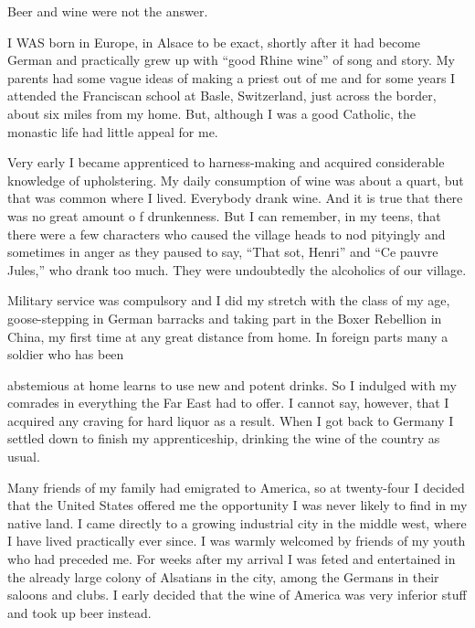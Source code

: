 

\bbChapterPreamble




\begin{biblechapter}
Beer and wine were not the answer.
\end{biblechapter}


\begin{biblechapter}
    I WAS born in Europe, in Alsace to be exact, 
    shortly after it had become German 
    and practically grew up with “good Rhine wine” of song and story.
\verse My parents had some vague ideas of making a priest out of me 
    and for some years I attended the Franciscan school 
    at Basle, Switzerland, 
    just across the border, 
    about six miles from my home.
\verse But, although I was a good Catholic, 
    the monastic life had little appeal for me.

\verse Very early I became apprenticed to harness-making and acquired considerable knowledge of upholstering. My daily consumption of wine was about a quart, but that was common where I lived. Everybody drank wine. And it is true that there was no great amount o f drunkenness. But I can remember, in my teens, that there were a few characters who caused the village heads to nod pityingly and sometimes in anger as they paused to say, “That sot, Henri” and “Ce pauvre Jules,” who drank too much. They were undoubtedly the alcoholics of our village.

Military service was compulsory and I did my stretch with the class of my age, goose-stepping in German barracks and taking part in the Boxer Rebellion in China, my first time at any great distance from home. In foreign parts many a soldier who has been

abstemious at home learns to use new and potent drinks. So I indulged with my comrades in everything the Far East had to offer. I cannot say, however, that I acquired any craving for hard liquor as a result. When I got back to Germany I settled down to finish my apprenticeship, drinking the wine of the country as usual.

Many friends of my family had emigrated to America, so at twenty-four I decided that the United States offered me the opportunity I was never likely to find in my native land. I came directly to a growing industrial city in the middle west, where I have lived practically ever since. I was warmly welcomed by friends of my youth who had preceded me. For weeks after my arrival I was feted and entertained in the already large colony of Alsatians in the city, among the Germans in their saloons and clubs. I early decided that the wine of America was very inferior stuff and took up beer instead.


\end{biblechapter}
